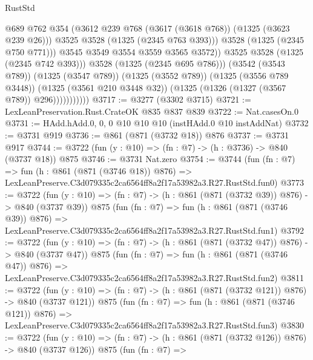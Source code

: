 \begin{lexlean}{RustStd}
\begin{coremodule}
                                  @689
                                  @762
                                  @354
                                  (@3612 @239 @768 (@3617 (@3618 @768)) (@1325 (@3623 @239 @26)))
                                  @3525
                                  @3528
                                  (@1325 (@2345 @763 @393)))
                                @3528
                                (@1325 (@2345 @750 @771)))
                              @3545
                              @3549
                              @3554
                              @3559
                              @3565
                              @3572))
                          @3525
                          @3528
                          (@1325 (@2345 @742 @393)))
                        @3528
                        (@1325 (@2345 @695 @786)))
                      (@3542 (@3543 @789))
                      (@1325 (@3547 @789))
                      (@1325 (@3552 @789))
                      (@1325 (@3556 @789 @3448))
                      (@1325 (@3561 @210 @3448 @32))
                      (@1325 (@1326 (@1327 (@3567 @789)) @296)))))))))))
@3717 := @3277 (@3302 @3715)
@3721 := LexLeanPreservation.Rust.CrateOK @835 @837 @839
@3722 := Nat.casesOn.{0}
@3731 := HAdd.hAdd.{0, 0, 0} @10 @10 @10 (instHAdd.{0} @10 instAddNat)
@3732 := @3731 @919
@3736 := @861 (@871 (@3732 @18)) @876
@3737 := @3731 @917
@3744 := @3722 (fun (y : @10) => (fn : @7) -> (h : @3736) -> @840 (@3737 @18)) @875
@3746 := @3731 Nat.zero
@3754 := @3744
    (fun (fn : @7) =>
    fun (h : @861 (@871 (@3746 @18)) @876) =>
    LexLeanPreserve.C3d079335c2ca6564ff8a2f17a53982a3.R27.RustStd.fun0)
@3773 := @3722
    (fun (y : @10) => (fn : @7) -> (h : @861 (@871 (@3732 @39)) @876) -> @840 (@3737 @39))
    @875
    (fun (fn : @7) =>
    fun (h : @861 (@871 (@3746 @39)) @876) =>
    LexLeanPreserve.C3d079335c2ca6564ff8a2f17a53982a3.R27.RustStd.fun1)
@3792 := @3722
    (fun (y : @10) => (fn : @7) -> (h : @861 (@871 (@3732 @47)) @876) -> @840 (@3737 @47))
    @875
    (fun (fn : @7) =>
    fun (h : @861 (@871 (@3746 @47)) @876) =>
    LexLeanPreserve.C3d079335c2ca6564ff8a2f17a53982a3.R27.RustStd.fun2)
@3811 := @3722
    (fun (y : @10) => (fn : @7) -> (h : @861 (@871 (@3732 @121)) @876) -> @840 (@3737 @121))
    @875
    (fun (fn : @7) =>
    fun (h : @861 (@871 (@3746 @121)) @876) =>
    LexLeanPreserve.C3d079335c2ca6564ff8a2f17a53982a3.R27.RustStd.fun3)
@3830 := @3722
    (fun (y : @10) => (fn : @7) -> (h : @861 (@871 (@3732 @126)) @876) -> @840 (@3737 @126))
    @875
    (fun (fn : @7) =>

\end{coremodule}
\end{lexlean}

